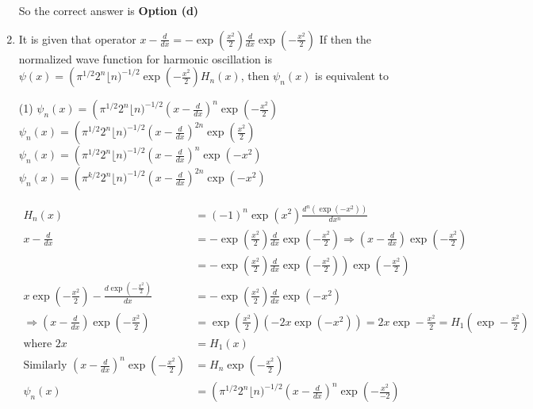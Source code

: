 \begin{enumerate}[label=\color{ocre}\textbf{\arabic*.}]
\begin{answer}
		So the correct answer is \textbf{Option (d)}
\end{answer}
\item It is given that operator $x-\frac{d}{d x}=-\exp \left(\frac{x^{2}}{2}\right) \frac{d}{d x} \exp \left(-\frac{x^{2}}{2}\right)$
If then the normalized wave function for harmonic oscillation is $\psi(x)=\left(\pi^{1 / 2} 2^{n}\lfloor n)^{-1 / 2} \exp \left(-\frac{x^{2}}{2}\right) H_{n}(x)\right.$, then $\psi_n(x)$ is equivalent to 
 \begin{tasks}(1)
	\task[\textbf{a.}]$\psi_{n}(x)=\left(\pi^{1 / 2} 2^{n}\lfloor n)^{-1 / 2}\left(x-\frac{d}{d x}\right)^{n} \exp \left(-\frac{x^{2}}{2}\right)\right.$
	\task[\textbf{b.}] $\psi_{n}(x)=\left(\pi^{1 / 2} 2^{n}\lfloor n)^{-1 / 2}\left(x-\frac{d}{d x}\right)^{2 n} \exp \left(\frac{x^{2}}{2}\right)\right.$
	\task[\textbf{c.}] $\psi_{n}(x)=\left(\pi^{1 / 2} 2^{n}\lfloor n)^{-1 / 2}\left(x-\frac{d}{d x}\right)^{n} \exp \left(-x^{2}\right)\right.$
	\task[\textbf{d.}] $\psi_{n}(x)=\left(\pi^{k / 2} 2^{n}\lfloor n)^{-1 / 2}\left(x-\frac{d}{d x}\right)^{2 n} \operatorname{cxp}\left(-x^{2}\right)\right.$
\end{tasks}
\begin{answer}
	\begin{align*}
	H_{n}(x)&=(-1)^{n} \exp \left(x^{2}\right) \frac{d^{n}\left(\exp \left(-x^{2}\right)\right)}{d x^{n}}\\
	x-\frac{d}{d x} &=-\exp \left(\frac{x^{2}}{2}\right) \frac{d}{d x} \exp \left(-\frac{x^{2}}{2}\right) \Rightarrow\left(x-\frac{d}{d x}\right) \exp \left(-\frac{x^{2}}{2}\right) \\ &\left.=-\exp \left(\frac{x^{2}}{2}\right) \frac{d}{d x} \exp \left(-\frac{x^{2}}{2}\right)\right) \exp \left(-\frac{x^{2}}{2}\right)\\
	x \exp \left(-\frac{x^{2}}{2}\right)-\frac{d \exp \left(-\frac{x^{2}}{2}\right)}{d x}&=-\exp \left(\frac{x^{2}}{2}\right) \frac{d}{d x} \exp \left(-x^{2}\right)\\
	\Rightarrow\left(x-\frac{d}{d x}\right) \exp \left(-\frac{x^{2}}{2}\right)&=\exp \left(\frac{x^{2}}{2}\right)\left(-2 x \exp \left(-x^{2}\right)\right)=2 x \exp -\frac{x^{2}}{2}=H_{1}\left(\exp -\frac{x^{2}}{2}\right)\\
	\text{where }2 x&=H_{1}(x)\\
	\text{Similarly }\left(x-\frac{d}{d x}\right)^{n} \exp \left(-\frac{x^{2}}{2}\right)&=H_{n} \exp \left(-\frac{x^{2}}{2}\right)\\
	\psi_{n}(x)&=\left(\pi^{1 / 2} 2^{n}\lfloor n)^{-1 / 2}\left(x-\frac{d}{d x}\right)^{n} \exp \left(-\frac{x^{2}}{-2}\right)\right.

\end{align*}
\end{answer}
\end{enumerate}
